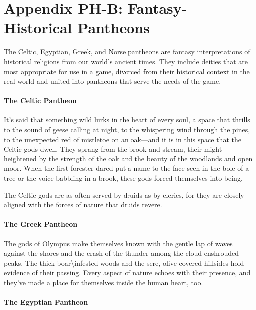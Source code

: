 \documentclass[
]{article}
\date{}
\begin{document}
\hypertarget{appendix-ph-b-fantasy-historical-pantheons}{%
\section{Appendix PH-B: Fantasy-Historical
Pantheons}\label{appendix-ph-b-fantasy-historical-pantheons}}

The Celtic, Egyptian, Greek, and Norse pantheons are fantasy
interpretations of historical religions from our world's ancient times.
They include deities that are most appropriate for use in a game,
divorced from their historical context in the real world and united into
pantheons that serve the needs of the game.

\hypertarget{the-celtic-pantheon}{%
\paragraph{The Celtic Pantheon}\label{the-celtic-pantheon}}

It's said that something wild lurks in the heart of every soul, a space
that thrills to the sound of geese calling at night, to the whispering
wind through the pines, to the unexpected red of mistletoe on an
oak---and it is in this space that the Celtic gods dwell. They sprang
from the brook and stream, their might heightened by the strength of the
oak and the beauty of the woodlands and open moor. When the first
forester dared put a name to the face seen in the bole of a tree or the
voice babbling in a brook, these gods forced themselves into being.

The Celtic gods are as often served by druids as by clerics, for they
are closely aligned with the forces of nature that druids revere.

\hypertarget{the-greek-pantheon}{%
\paragraph{The Greek Pantheon}\label{the-greek-pantheon}}

The gods of Olympus make themselves known with the gentle lap of waves
against the shores and the crash of the thunder among the
cloud-enshrouded peaks. The thick boar\textbackslash infested woods and
the sere, olive-covered hillsides hold evidence of their passing. Every
aspect of nature echoes with their presence, and they've made a place
for themselves inside the human heart, too.

\hypertarget{the-egyptian-pantheon}{%
\paragraph{The Egyptian Pantheon}\label{the-egyptian-pantheon}}
\end{document}
